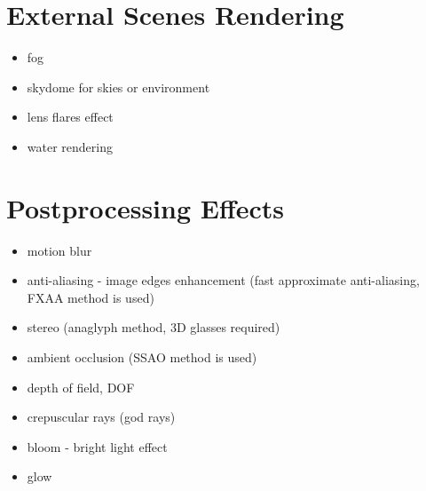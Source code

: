 \documentclass[a4paper,12pt,oneside]{sphinxmanual}
\begin{document}
\section{External Scenes Rendering}
\label{features:id7}\begin{itemize}
\item {} 
fog

\item {} 
skydome for skies or environment

\item {} 
lens flares effect

\item {} 
water rendering

\end{itemize}


\section{Postprocessing Effects}
\label{features:id8}\begin{itemize}
\item {} 
motion blur

\item {} 
anti-aliasing - image edges enhancement (fast approximate anti-aliasing, FXAA method is used)

\item {} 
stereo (anaglyph method, 3D glasses required)

\item {} 
ambient occlusion (SSAO method is used)

\item {} 
depth of field, DOF

\item {} 
crepuscular rays (god rays)

\item {} 
bloom - bright light effect

\item {} 
glow

\end{itemize}
\end{document}
